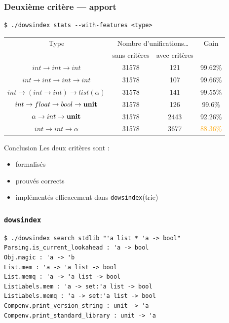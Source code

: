 \documentclass[serif]{beamer}
\newcommand{\dowsindex}{\texttt{dowsindex}\xspace}
\begin{document}
\begin{frame}[fragile=singleslide]\frametitle{Deuxième critère — apport}
\small
\begin{verbatim}
$ ./dowsindex stats --with-features <type>
\end{verbatim}
\begin{table}[h]
  \centering
  \begin{tabular}{|*{4}{c|}}
    \hline
      Type &
      \multicolumn{2}{c|}{Nombre d'unifications\dots} &
      Gain
    \\
    \cline{2-3}
      &
      sans critères & avec critères &
    \\
    \hline
      $int \rightarrow int \rightarrow int$ &
      31578 & 121 & 99.62\%
    \\
      $int \rightarrow int \rightarrow int \rightarrow int$ &
      31578 & 107 & 99.66\%
    \\
      $int \rightarrow (int \rightarrow int) \rightarrow list (\alpha)$ &
      31578 & 141 & 99.55\%
    \\
      $int \rightarrow float \rightarrow bool \rightarrow \bold{unit}$ &
      31578 & 126 & 99.6\%
    \\
      $\alpha \rightarrow int \rightarrow \bold{unit}$ &
      31578 & 2443 & 92.26\%
    \\
      $int \rightarrow int \rightarrow \alpha$ &
      31578 & 3677 & \textcolor{orange}{88.36\%}
    \\
    \hline
  \end{tabular}
\end{table}
\end{frame}


\begin{frame}{Conclusion}
Les deux critères sont :
\begin{itemize}
  \item formalisés
  \item prouvés corrects
  \item implémentés efficacement dans \dowsindex (trie)
\end{itemize}
\end{frame}


\begin{frame}[fragile=singleslide]\frametitle{\dowsindex}
\small
\begin{verbatim}
$ ./dowsindex search stdlib "'a list * 'a -> bool"
Parsing.is_current_lookahead : 'a -> bool
Obj.magic : 'a -> 'b
List.mem : 'a -> 'a list -> bool
List.memq : 'a -> 'a list -> bool
ListLabels.mem : 'a -> set:'a list -> bool
ListLabels.memq : 'a -> set:'a list -> bool
Compenv.print_version_string : unit -> 'a
Compenv.print_standard_library : unit -> 'a
\end{verbatim}
\end{frame}
\end{document}
